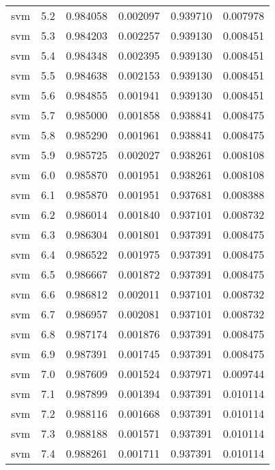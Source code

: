 \begin{tabular}{lrrrrr}
     svm &        5.2 &    0.984058 &   0.002097 &   0.939710 &  0.007978 \\
     svm &        5.3 &    0.984203 &   0.002257 &   0.939130 &  0.008451 \\
     svm &        5.4 &    0.984348 &   0.002395 &   0.939130 &  0.008451 \\
     svm &        5.5 &    0.984638 &   0.002153 &   0.939130 &  0.008451 \\
     svm &        5.6 &    0.984855 &   0.001941 &   0.939130 &  0.008451 \\
     svm &        5.7 &    0.985000 &   0.001858 &   0.938841 &  0.008475 \\
     svm &        5.8 &    0.985290 &   0.001961 &   0.938841 &  0.008475 \\
     svm &        5.9 &    0.985725 &   0.002027 &   0.938261 &  0.008108 \\
     svm &        6.0 &    0.985870 &   0.001951 &   0.938261 &  0.008108 \\
     svm &        6.1 &    0.985870 &   0.001951 &   0.937681 &  0.008388 \\
     svm &        6.2 &    0.986014 &   0.001840 &   0.937101 &  0.008732 \\
     svm &        6.3 &    0.986304 &   0.001801 &   0.937391 &  0.008475 \\
     svm &        6.4 &    0.986522 &   0.001975 &   0.937391 &  0.008475 \\
     svm &        6.5 &    0.986667 &   0.001872 &   0.937391 &  0.008475 \\
     svm &        6.6 &    0.986812 &   0.002011 &   0.937101 &  0.008732 \\
     svm &        6.7 &    0.986957 &   0.002081 &   0.937101 &  0.008732 \\
     svm &        6.8 &    0.987174 &   0.001876 &   0.937391 &  0.008475 \\
     svm &        6.9 &    0.987391 &   0.001745 &   0.937391 &  0.008475 \\
     svm &        7.0 &    0.987609 &   0.001524 &   0.937971 &  0.009744 \\
     svm &        7.1 &    0.987899 &   0.001394 &   0.937391 &  0.010114 \\
     svm &        7.2 &    0.988116 &   0.001668 &   0.937391 &  0.010114 \\
     svm &        7.3 &    0.988188 &   0.001571 &   0.937391 &  0.010114 \\
     svm &        7.4 &    0.988261 &   0.001711 &   0.937391 &  0.010114 \\

\end{tabular}
